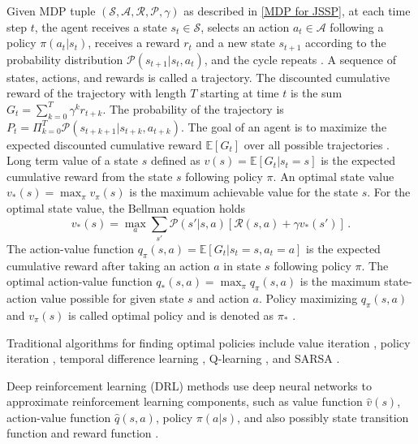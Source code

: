 Given MDP tuple $(\mathcal{S}, \mathcal{A}, \mathcal{R}, \mathcal{P}, \gamma)$ as described in \ref{MDP for JSSP}, at each time step $t$, the agent receives a state $s_t \in \mathcal{S}$, selects an action $a_t \in \mathcal{A}$ following a policy $\pi(a_t|s_t)$, receives a reward $r_t$ and a new state $s_{t+1}$ according to the probability distribution $\mathcal{P}(s_{t+1} | s_t, a_t)$, and the cycle repeats \cite{DBLP:journals/corr/Li17b}. A sequence of states, actions, and rewards is called a trajectory. The discounted cumulative reward of the trajectory with length $T$ starting at time $t$ is the sum $G_t = \sum_{k=0}^T \gamma^k r_{t+k}$. The probability of the trajectory is $P_t = \Pi_{k=0}^T \mathcal{P}(s_{t+k+1} | s_{t+k}, a_{t+k})$. The goal of an agent is to maximize the expected discounted cumulative reward $\mathbb{E}[G_t]$ over all possible trajectories \cite{DBLP:journals/corr/Li17b}. Long term value of a state $s$ defined as $v(s) = \mathbb{E}\left [ G_t | s_t = s \right ]$ is the expected cumulative reward from the state $s$ following policy $\pi$. An optimal state value $v_*(s) = \max_\pi v_\pi(s)$ is the maximum achievable value for the state $s$. For the optimal state value, the Bellman equation holds \cite{DBLP:journals/corr/Li17b}
\begin{equation}
	v_*(s) = \max_a \sum_{s'} \mathcal{P} (s' | s,a)\left [ \mathcal{R}(s, a) + \gamma v_*(s') \right ] \, .
\end{equation}
The action-value function $q_\pi(s,a) = \mathbb{E} \left [ G_t | s_t=s, a_t=a\right ]$ is the expected cumulative reward after taking an action $a$ in state $s$ following policy $\pi$. The optimal action-value function $q_* (s,a) = \max_\pi q_\pi(s, a)$ is the maximum state-action value possible for given state $s$ and action $a$. Policy maximizing $q_\pi(s,a)$ and $v_\pi(s)$ is called optimal policy and is denoted as $\pi_*$ \cite{DBLP:journals/corr/Li17b}.
\par
Traditional algorithms for finding optimal policies include value iteration \cite{barto1989learning}, policy iteration \cite{Howard1960DynamicPA}, temporal difference learning \cite{tesauro1995temporal}, Q-learning \cite{watkins1992q}, and SARSA \cite{sarsa}.
\par
Deep reinforcement learning (DRL) methods use deep neural networks to approximate reinforcement learning components, such as value function $\hat{v}(s)$, action-value function $\hat{q}(s, a)$, policy $\pi(a|s)$, and also possibly state transition function and reward function  \cite{DBLP:journals/corr/Li17b}. 

